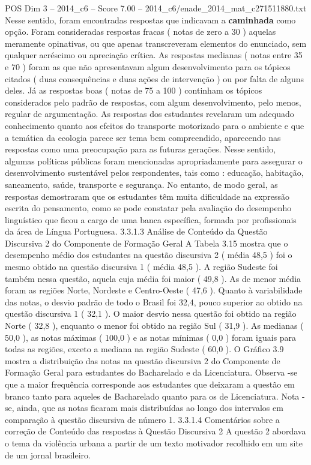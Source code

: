\begin{textsample}{POS Dim 3 – 2014\_c6 – Score 7.00 – 2014\_c6/enade\_2014\_mat\_c271511880.txt}
Nesse sentido, foram encontradas respostas que indicavam a \textbf{caminhada} como opção.
Foram consideradas respostas fracas ( notas de zero a 30 ) aquelas meramente opinativas, ou que apenas transcreveram elementos do enunciado, sem qualquer acréscimo ou apreciação crítica.
As respostas medianas ( notas entre 35 e 70 ) foram as que não apresentavam algum desenvolvimento para os tópicos citados ( duas consequências e duas ações de intervenção ) ou por falta de alguns deles.
Já as respostas boas ( notas de 75 a 100 ) continham os tópicos considerados pelo padrão de respostas, com algum desenvolvimento, pelo menos, regular de argumentação.
As respostas dos estudantes revelaram um adequado conhecimento quanto aos efeitos do transporte motorizado para o ambiente e que a temática da ecologia parece ser tema bem compreendido, aparecendo nas respostas como uma preocupação para as futuras gerações.
Nesse sentido, algumas políticas públicas foram mencionadas apropriadamente para assegurar o desenvolvimento sustentável pelos respondentes, tais como : educação, habitação, saneamento, saúde, transporte e segurança.
No entanto, de modo geral, as respostas demostraram que os estudantes têm muita dificuldade na expressão escrita do pensamento, como se pode constatar pela avaliação do desempenho linguístico que ficou a cargo de uma banca específica, formada por profissionais da área de Língua Portuguesa. 3.3.1.3 Análise de Conteúdo da Questão Discursiva 2 do Componente de Formação Geral A Tabela 3.15 mostra que o desempenho médio dos estudantes na questão discursiva 2 ( média 48,5 ) foi o mesmo obtido na questão discursiva 1 ( média 48,5 ).
A região Sudeste foi também nessa questão, aquela cuja média foi maior ( 49,8 ).
As de menor média foram as regiões Norte, Nordeste e Centro-Oeste ( 47,6 ).
Quanto à variabilidade das notas, o desvio padrão de todo o Brasil foi 32,4, pouco superior ao obtido na questão discursiva 1 ( 32,1 ).
O maior desvio nessa questão foi obtido na região Norte ( 32,8 ), enquanto o menor foi obtido na região Sul ( 31,9 ).
As medianas ( 50,0 ), as notas máximas ( 100,0 ) e as notas mínimas ( 0,0 ) foram iguais para todas as regiões, exceto a mediana na região Sudeste ( 60,0 ).
O Gráfico 3.9 mostra a distribuição das notas na questão discursiva 2 do Componente de Formação Geral para estudantes do Bacharelado e da Licenciatura.
Observa -se que a maior frequência corresponde aos estudantes que deixaram a questão em branco tanto para aqueles de Bacharelado quanto para os de Licenciatura.
Nota -se, ainda, que as notas ficaram mais distribuídas ao longo dos intervalos em comparação à questão discursiva de número 1. 3.3.1.4 Comentários sobre a correção de Conteúdo das respostas à Questão Discursiva 2 A questão 2 abordava o tema da violência urbana a partir de um texto motivador recolhido em um site de um jornal brasileiro.

\end{textsample}
